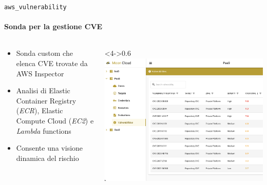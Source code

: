 \documentclass{beamer}
\begin{document}
\begin{frame}{\texttt{aws\_vulnerability}}
    \framesubtitle{Sonda per la gestione CVE}
    \begin{columns}
        \begin{column}{0.4\textwidth}
            \begin{itemize}
            \item<1-> Sonda custom che elenca CVE trovate da AWS Inspector
            \item<2-> Analisi di Elastic Container Registry (\emph{ECR}), 
                Elastic Compute Cloud (\emph{EC2}) e \emph{Lambda} functions
            \item<3-> Consente una visione dinamica del rischio
        \end{itemize}
        \end{column}
        \begin{column}<4->{0.6\textwidth}
            \includegraphics[width=\textwidth]{assets/cvepaas.png}
        \end{column}
    \end{columns}
\end{frame}
\end{document}
